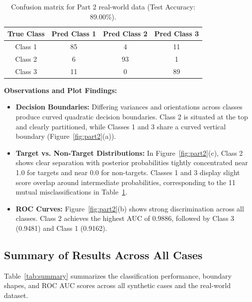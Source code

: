 \documentclass[11pt,a4paper]{article}
\begin{document}
\begin{table}[ht]
\centering
\begin{tabular}{cccc}
\toprule
\textbf{True Class} & \textbf{Pred Class 1} & \textbf{Pred Class 2} & \textbf{Pred Class 3}\\
\midrule
Class 1 & 85 & 4 & 11\\
Class 2 & 6 & 93 & 1\\
Class 3 & 11 & 0 & 89\\
\bottomrule
\end{tabular}
\caption{Confusion matrix for Part 2 real-world data (Test Accuracy: 89.00\%).}
\label{tab:c_real}
\end{table}

\textbf{Observations and Plot Findings:}
\begin{itemize}
  \item \textbf{Decision Boundaries:} Differing variances and orientations across classes produce curved quadratic decision boundaries. Class 2 is situated at the top and clearly partitioned, while Classes 1 and 3 share a curved vertical boundary (Figure~\ref{fig:part2}(a)).
  \item \textbf{Target vs. Non-Target Distributions:} In Figure~\ref{fig:part2}(c), Class 2 shows clear separation with posterior probabilities tightly concentrated near 1.0 for targets and near 0.0 for non-targets. Classes 1 and 3 display slight score overlap around intermediate probabilities, corresponding to the 11 mutual misclassifications in Table~\ref{tab:c_real}.
  \item \textbf{ROC Curves:} Figure~\ref{fig:part2}(b) shows strong discrimination across all classes. Class 2 achieves the highest AUC of 0.9886, followed by Class 3 (0.9481) and Class 1 (0.9162).
\end{itemize}

\subsection{Summary of Results Across All Cases}
Table~\ref{tab:summary} summarizes the classification performance, boundary shapes, and ROC AUC scores across all synthetic cases and the real-world dataset.
\end{document}
